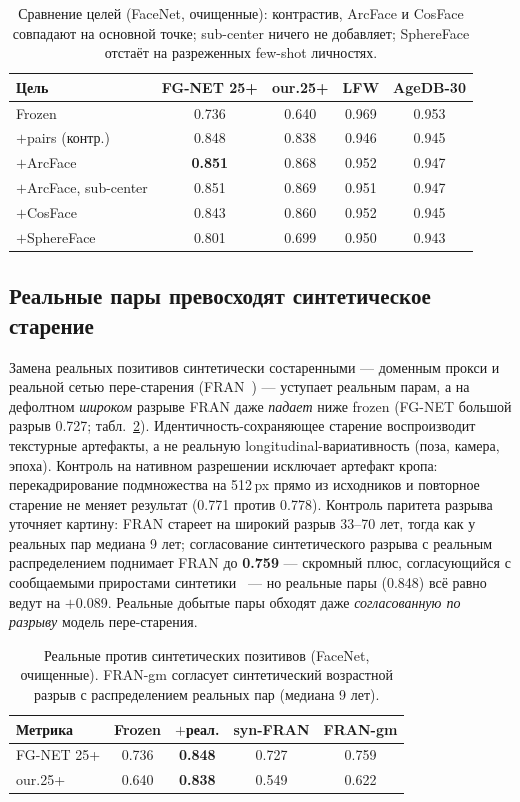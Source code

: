 \documentclass[10pt,twocolumn,letterpaper]{article}
\begin{document}
\begin{table}[t]
\centering
\setlength{\tabcolsep}{3pt}
\small
\begin{tabular}{@{}lcccc@{}}
\toprule
Цель & FG-NET 25+ & our.25+ & LFW & AgeDB-30 \\
\midrule
Frozen & 0.736 & 0.640 & 0.969 & 0.953 \\
$+$pairs (контр.) & 0.848 & 0.838 & 0.946 & 0.945 \\
$+$ArcFace & \textbf{0.851} & 0.868 & 0.952 & 0.947 \\
$+$ArcFace, sub-center & 0.851 & 0.869 & 0.951 & 0.947 \\
$+$CosFace & 0.843 & 0.860 & 0.952 & 0.945 \\
$+$SphereFace & 0.801 & 0.699 & 0.950 & 0.943 \\
\bottomrule
\end{tabular}
\caption{Сравнение целей (FaceNet, очищенные): контрастив, ArcFace и CosFace совпадают на основной
точке; sub-center ничего не добавляет; SphereFace отстаёт на разреженных few-shot личностях.}
\label{tab:objective}
\end{table}

\subsection{Реальные пары превосходят синтетическое старение}\label{sec:res-synth}
Замена реальных позитивов синтетически состаренными — доменным прокси и реальной сетью пере-старения
(FRAN~\cite{zoss2022fran}) — уступает реальным парам, а на дефолтном \emph{широком} разрыве FRAN даже
\emph{падает} ниже frozen (FG-NET большой разрыв 0.727; табл.~\ref{tab:synth}). Идентичность-сохраняющее
старение воспроизводит текстурные артефакты, а не реальную longitudinal-вариативность (поза, камера,
эпоха). Контроль на нативном разрешении исключает артефакт кропа: перекадрирование подмножества на
512\,px прямо из исходников и повторное старение не меняет результат (0.771 против 0.778). Контроль
паритета разрыва уточняет картину: FRAN стареет на широкий разрыв 33--70 лет, тогда как у реальных пар
медиана 9 лет; согласование синтетического разрыва с реальным распределением поднимает FRAN до
\textbf{0.759} — скромный плюс, согласующийся с сообщаемыми приростами синтетики~\cite{yao2024synthageing}
— но реальные пары (0.848) всё равно ведут на $+$0.089. Реальные добытые пары обходят даже
\emph{согласованную по разрыву} модель пере-старения.

\begin{table}[t]
\centering
\setlength{\tabcolsep}{4pt}
\small
\begin{tabular}{@{}lcccc@{}}
\toprule
Метрика & Frozen & $+$реал. & syn-FRAN & FRAN-gm \\
\midrule
FG-NET 25+ & 0.736 & \textbf{0.848} & 0.727 & 0.759 \\
our.25+ & 0.640 & \textbf{0.838} & 0.549 & 0.622 \\
\bottomrule
\end{tabular}
\caption{Реальные против синтетических позитивов (FaceNet, очищенные). FRAN-gm согласует синтетический
возрастной разрыв с распределением реальных пар (медиана 9 лет).}
\label{tab:synth}
\end{table}
\end{document}
